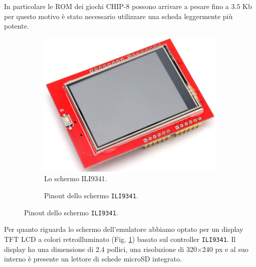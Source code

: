 \documentclass[a4paper]{article}
\begin{document}
In particolare le ROM dei giochi CHIP-8 possono arrivare a pesare fino a 3.5 Kb per questo
motivo è stato necessario utilizzare una scheda leggermente più potente.

\begin{figure}[h!t]
    \begin{subfigure}[b]{0.45\textwidth}
        \begin{center}
            \includegraphics[scale=0.30]{figures/ili9341.png}
        \end{center}
        \caption{Lo schermo ILI9341.}
        \label{fig:ili9341}
    \end{subfigure}
    \hfill
    \begin{subfigure}[b]{0.45\textwidth}
        \begin{center}
            \begin{tikzpicture}[x=0.015cm, y=0.015cm, scale=0.65, transform shape]
                
            \end{tikzpicture}
        \end{center}
        \caption{Pinout dello schermo \texttt{ILI9341}.}
        \label{fig:pinout_ili}
    \end{subfigure}
\end{figure}

Per quanto riguarda lo schermo dell'emulatore abbiamo optato per un display TFT LCD
a colori retroilluminato (Fig. \ref{fig:ili9341}) basato sul controller \texttt{ILI9341}.
Il display ha una dimensione di 2.4 pollici, una risoluzione di 320$\times$240 px e
al suo interno è presente un lettore di schede microSD integrato.
\end{document}
